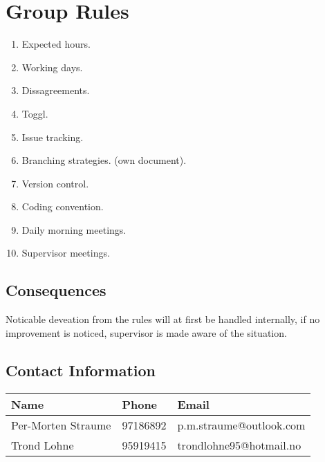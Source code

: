 \documentclass{article}
\begin{document}
\section*{Group Rules}

\begin{enumerate}
    \item Expected hours.
    \item Working days.
    \item Dissagreements.
    \item Toggl.
    \item Issue tracking.
    \item Branching strategies. (own document).
    \item Version control.
    \item Coding convention.
    \item Daily morning meetings.
    \item Supervisor meetings.
\end{enumerate}

\subsection*{Consequences}
Noticable deveation from the rules will at first be handled internally, if no improvement is noticed, supervisor is made aware of the situation.

\subsection*{Contact Information}
\begin{table}[h!]
    \begin{tabular}{lll}
        \toprule
        Name & Phone & Email \\
        \midrule
        Per-Morten Straume & 97186892 & p.m.straume@outlook.com \\
        Trond Lohne & 95919415 & trondlohne95@hotmail.no \\
        \bottomrule
    \end{tabular}
\end{table}
\end{document}

